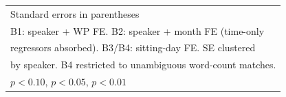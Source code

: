 \begin{table}[htbp]
\begin{tabular}{l*{4}{c}}
\bottomrule
\multicolumn{5}{l}{\footnotesize Standard errors in parentheses}\\
\multicolumn{5}{l}{\footnotesize B1: speaker + WP FE. B2: speaker + month FE (time-only}\\
\multicolumn{5}{l}{\footnotesize regressors absorbed). B3/B4: sitting-day FE. SE clustered}\\
\multicolumn{5}{l}{\footnotesize by speaker. B4 restricted to unambiguous word-count matches.}\\
\multicolumn{5}{l}{\footnotesize \sym{*} \(p<0.10\), \sym{**} \(p<0.05\), \sym{***} \(p<0.01\)}\\
\end{tabular}
\end{table}
